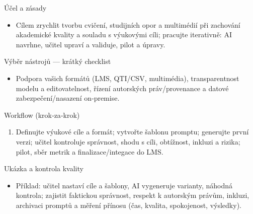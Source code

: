 Účel a zásady
\begin{itemize}\item Cílem zrychlit tvorbu cvičení, studijních opor a multimédií při zachování akademické kvality a souladu s výukovými cíli; pracujte iterativně: AI navrhne, učitel upraví a validuje, pilot a úpravy.\end{itemize}
Výběr nástrojů — krátký checklist
\begin{itemize}\item Podpora vašich formátů (LMS, QTI/CSV, multimédia), transparentnost modelu a editovatelnost, řízení autorských práv/provenance a datové zabezpečení/nasazení on‑premise.\end{itemize}
Workflow (krok‑za‑krok)
\begin{enumerate}\item Definujte výukové cíle a formát; vytvořte šablonu promptu; generujte první verzi; učitel kontroluje správnost, shodu s cíli, obtížnost, inkluzi a rizika; pilot, sběr metrik a finalizace/integace do LMS.\end{enumerate}
Ukázka a kontrola kvality
\begin{itemize}\item Příklad: učitel nastaví cíle a šablony, AI vygeneruje varianty, náhodná kontrola; zajistit faktickou správnost, respekt k autorským právům, inkluzi, archivaci promptů a měření přínosu (čas, kvalita, spokojenost, výsledky).\end{itemize}